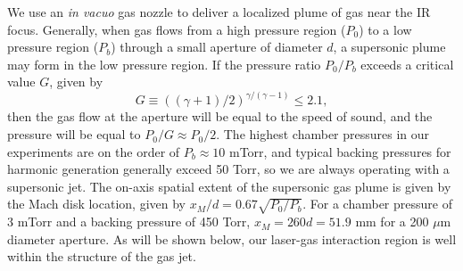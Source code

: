 We use an \textit{in vacuo} gas nozzle to deliver a localized plume of gas near the IR focus. Generally, when gas flows from a high pressure region ($P_0$) to a low pressure region ($P_b$) through a small aperture of diameter $d$, a supersonic plume may form in the low pressure region. If the pressure ratio $P_0/P_b$ exceeds a critical value $G$, given by
\begin{equation}
G \equiv ((\gamma+1)/2)^{\gamma/(\gamma-1)} \le 2.1,
\label{eqn:G_factor}
\end{equation}
then the gas flow at the aperture will be equal to the speed of sound, and the pressure will be equal to $P_0 / G \approx P_0/2$. The highest chamber pressures in our experiments are on the order of $P_b \approx 10$ mTorr, and typical backing pressures for harmonic generation generally exceed 50 Torr, so we are always operating with a supersonic jet. The on-axis spatial extent of the supersonic gas plume is given by the Mach disk location, given by $x_M / d = 0.67 \sqrt{P_0/P_b}$. For a chamber pressure of 3 mTorr and a backing pressure of 450 Torr, $x_M = 260d = 51.9$ mm for a 200 $\mu$m diameter aperture. As will be shown below, our laser-gas interaction region is well within the structure of the gas jet.

